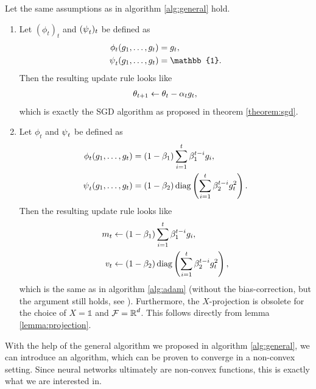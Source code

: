 \begin{example}
Let the same assumptions as in algorithm \ref{alg:general} hold.
\begin{enumerate}
\item Let $(\phi_t)_t$ and $(\operatorname{\psi}_t)_t$ be defined as
\begin{align*}
\phi_t(g_1,\ldots, g_t) &= g_t,\\
\p_t(g_1,\ldots, g_t) &= \mathbb{1}.
\end{align*}
Then the resulting update rule looks like
\begin{align*}
\theta_{t+1} \gets \theta_t - \alpha_t g_t,
\end{align*}
which is exactly the SGD algorithm as proposed in theorem \ref{theorem:sgd}.
\item Let $\phi_t$ and $\operatorname{\psi}_t$ be defined as
\begin{align*}
\phi_t(g_1,\ldots, g_t) &= (1-\beta_1)\sum_{i=1}^t\beta_1^{t-i}g_i,\\
\operatorname{\psi}_t(g_1,\ldots, g_t) &= (1-\beta_2)\operatorname{\text{diag}}\left(\sum_{i=1}^t\beta_2^{t-i}g_t^2\right).
\end{align*}
Then the resulting update rule looks like
\begin{align*}
m_t &\gets (1-\beta_1)\sum_{i=1}^t\beta_1^{t-i}g_i,\\
v_t &\gets (1-\beta_2)\operatorname{\text{diag}}\left(\sum_{i=1}^t\beta_2^{t-i}g_t^2\right),
\end{align*}
which is the same as in algorithm \ref{alg:adam} (without the bias-correction, but the argument still holds, see \cite{reddi2019convergence}). Furthermore, the $X$-projection is obsolete for the choice of $X=\mathbb{1}$ and $\operatorname{\mathcal{F}}=\operatorname{\mathbb{R}}^d$. This follows directly from lemma \ref{lemma:projection}.
\end{enumerate}
\end{example}

With the help of the general algorithm we proposed in algorithm \ref{alg:general}, we can introduce an algorithm, which can be proven to converge in a non-convex setting. Since neural networks ultimately are non-convex functions, this is exactly what we are interested in.

